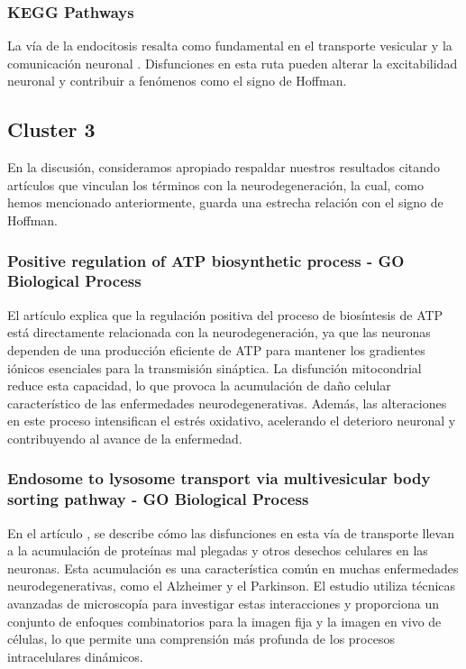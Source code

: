 \subsubsection{KEGG Pathways}

La vía de la endocitosis resalta como fundamental en el transporte vesicular y la comunicación neuronal \cite{conner_endocytosis_2003}. Disfunciones en esta ruta pueden alterar la excitabilidad neuronal y contribuir a fenómenos como el signo de Hoffman.




\subsection{Cluster 3}

En la discusión, consideramos apropiado respaldar nuestros resultados citando artículos que vinculan los términos con la neurodegeneración, la cual, como hemos mencionado anteriormente, guarda una estrecha relación con el signo de Hoffman.

\subsubsection{Positive regulation of ATP biosynthetic process - GO Biological Process}
El artículo \cite{Bonvento2017} explica que la regulación positiva del proceso de biosíntesis de ATP está directamente relacionada con la neurodegeneración, ya que las neuronas dependen de una producción eficiente de ATP para mantener los gradientes iónicos esenciales para la transmisión sináptica. La disfunción mitocondrial reduce esta capacidad, lo que provoca la acumulación de daño celular característico de las enfermedades neurodegenerativas. Además, las alteraciones en este proceso intensifican el estrés oxidativo, acelerando el deterioro neuronal y contribuyendo al avance de la enfermedad. 

\subsubsection{Endosome to lysosome transport via multivesicular body sorting pathway - GO Biological Process}
En el artículo \cite{Mulligan2023}, se describe cómo las disfunciones en esta vía de transporte llevan a la acumulación de proteínas mal plegadas y otros desechos celulares en las neuronas. Esta acumulación es una característica común en muchas enfermedades neurodegenerativas, como el Alzheimer y el Parkinson. El estudio utiliza técnicas avanzadas de microscopía para investigar estas interacciones y proporciona un conjunto de enfoques combinatorios para la imagen fija y la imagen en vivo de células, lo que permite una comprensión más profunda de los procesos intracelulares dinámicos.


